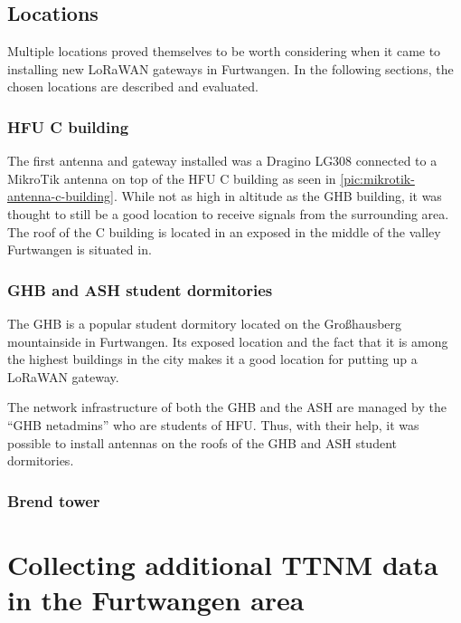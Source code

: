 \subsection{Locations}


Multiple locations proved themselves to be worth considering when it came to installing new \ac{LoRaWAN} gateways in Furtwangen.
In the following sections, the chosen locations are described and evaluated.

\subsubsection{\ac{HFU} C building}

The first antenna and gateway installed was a Dragino LG308 connected to a MikroTik antenna on top of the \ac{HFU} C building as seen in \cref{pic:mikrotik-antenna-c-building}.
While not as high in altitude as the \ac{GHB} building, it was thought to still be a good location to receive signals from the surrounding area.
The roof of the C building is located in an exposed in the middle of the valley Furtwangen is situated in.

\subsubsection{\acf{GHB} and \acf{ASH} student dormitories}

The \ac{GHB} is a popular student dormitory located on the Großhausberg mountainside in Furtwangen.
Its exposed location and the fact that it is among the highest buildings in the city makes it a good location for putting up a \ac{LoRaWAN} gateway.

The network infrastructure of both the \ac{GHB} and the \ac{ASH} are managed by the ``\ac{GHB} netadmins'' who are students of \ac{HFU}.
Thus, with their help, it was possible to install antennas on the roofs of the \ac{GHB} and \ac{ASH} student dormitories.

\subsubsection{Brend tower}


\section{Collecting additional \ac{TTNM} data in the Furtwangen area}

